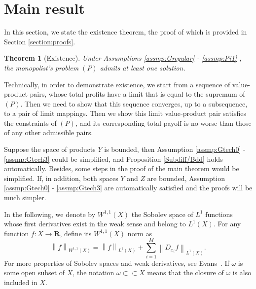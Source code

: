 \documentclass[a4paper, 11pt]{amsart}
\numberwithin{equation}{section}
\theoremstyle{plain}
\newtheorem{theorem}{Theorem}[section]
\theoremstyle{definition}
\theoremstyle{remark}
\newcommand{\R}{\mathbf{R}}
\newcommand{\norm}[1]{\left\lVert#1\right\rVert}
\begin{document}
\bigskip







\section{Main result}\label{section:mainresult}
In this section, we state the existence theorem, the proof of which is provided in Section \ref{section:proofs}. 


\begin{theorem}[Existence]\label{maintheorem}
	Under Assumptions \ref{assmp:Gregular} - \ref{assmp:Pi1}%
	, the monopolist's problem $(P)$ admits at least one solution.
\end{theorem}

Technically, in order to demonstrate existence, we start from a sequence of value-product pairs, whose total profits have a limit that is equal to the supremum of $(P)$.
Then we need to show that this sequence converges, up to a subsequence, to a pair of limit mappings. Then we show this limit value-product pair satisfies the constraints of $(P)$, and its corresponding total payoff is no worse than those of any other admissible pairs. \medskip

Suppose the space of products $Y$ is bounded, then Assumption \ref{assmp:Gtech0} - \ref{assmp:Gtech3} could be simplified, and Proposition \ref{Subdiff/Bdd} holds automatically. Besides, some steps in the proof of the main theorem would be simplified. If, in addition, both spaces $Y$ and $Z$ are bounded, Assumption \ref{assmp:Gtech0} - \ref{assmp:Gtech3} are automatically satisfied and the proofs will be much simpler.%
\medskip


In the following, we denote by $W^{1,1}(X)$  the Sobolev space of $L^1$ functions whose first derivatives exist in the weak sense and belong to $L^1(X)$. 
	For any function $f: X \rightarrow \R$, define its $W^{1,1}(X)$ norm as 
	\begin{equation*}
		\norm{f}_{W^{1,1}(X)} = \norm{f}_{L^1(X)} + \sum_{i=1}^{M}\norm{D_{x_i}f}_{L^1(X)}.
	\end{equation*}
For more properties of Sobolev spaces and weak derivatives, see Evans~\cite[Chapter 5]{Evans98}. If $\omega$ is some open subset of $X$, the notation $\omega \subset \subset X$ means that the closure of $\omega$ is also included in $X$.\medskip
\end{document}
